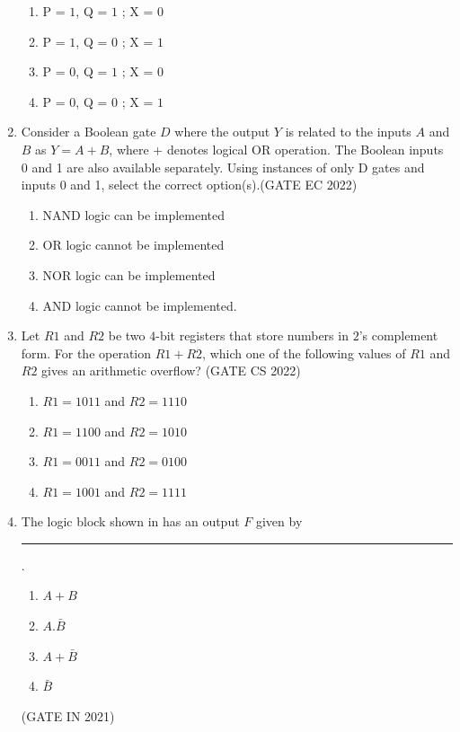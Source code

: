 \begin{enumerate}[label=\arabic*.,ref=\theenumi]
		\begin{enumerate}[label=(\Alph*)]
		\item P = $1$, Q = $1$ ; X = $0$
		\item P = $1$, Q = $0$ ; X = $1$
		\item P = $0$, Q = $1$ ; X = $0$
		\item P = $0$, Q = $0$ ; X = $1$
	\end{enumerate}
\item 
Consider a Boolean gate $D$ where the output $Y$ is related to the inputs $A$ and $B$ as $Y = A + B$, where + denotes logical OR operation. The Boolean inputs 0 and 1 are also available separately. Using instances of only D gates and inputs 0 and 1, select the correct option(s).\hfill{(GATE EC 2022)}
\begin{enumerate}
\item  NAND logic can be implemented
\item  OR logic cannot be implemented
\item  NOR logic can be implemented
\item  AND logic cannot be implemented.
\end{enumerate}
%
\item Let $R1$ and $R2$ be two $4$-bit registers that store numbers in $2$’s complement form.
For the operation $R1+R2$, which one of the following values of $R1$ and $R2$ gives an
arithmetic overflow?
\hfill{(GATE CS 2022)}
%
    \begin{enumerate}
        \item $R1 = 1011$ and $R2 = 1110$
        \item $R1 = 1100$ and $R2 = 1010$
        \item $R1 = 0011$ and $R2 = 0100$
        \item $R1 = 1001$ and $R2 = 1111$
    \end{enumerate}
\item The logic block shown 
in
	has an output $F$ given by \rule{1cm}{0.5pt}.
\begin{enumerate}
	\item$A+B$
	\item$A.\bar{B}$
	\item$A+\bar{B}$
	\item$\bar{B}$
\end{enumerate}
\hfill (GATE IN 2021)
\begin{figure}[H]
\centering

\end{figure}
\end{enumerate}
